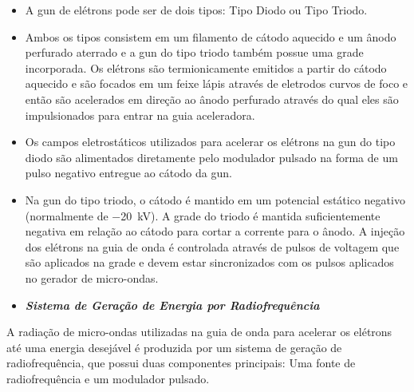 \documentclass[11pt,a4paper]{article}
\begin{document}
    \begin{itemize}
		\item A gun de elétrons pode ser de dois tipos: Tipo Diodo ou Tipo Triodo.
		
		\item Ambos os tipos consistem em um filamento de cátodo aquecido e um ânodo perfurado aterrado e a gun do tipo triodo também possue uma grade incorporada. Os elétrons são  termionicamente emitidos a partir do cátodo aquecido e são focados em um feixe lápis através de eletrodos curvos de foco e então são acelerados em direção ao ânodo perfurado  através do qual eles são impulsionados para entrar na guia aceleradora.
		
		\item Os campos eletrostáticos utilizados para acelerar os elétrons na gun do tipo diodo são alimentados diretamente pelo modulador pulsado na forma de um pulso negativo entregue ao cátodo da gun.
		
		\item Na gun do tipo triodo, o cátodo é mantido em um potencial estático negativo (normalmente de \qty{-20}{kV}). A grade do triodo é mantida suficientemente negativa em relação ao cátodo para cortar a corrente para o ânodo. A injeção dos elétrons na guia de onda é controlada através de pulsos de voltagem que são aplicados na grade e devem estar sincronizados com os pulsos aplicados no gerador de micro-ondas.
	\end{itemize}                
                    
            
                \begin{itemize}
                    \item \textbf{\textit{\textcolor{CarnationPink}{Sistema de Geração de Energia por Radiofrequência}}}
                \end{itemize}

    A radiação de micro-ondas utilizadas na guia de onda para acelerar os elétrons até uma energia desejável é produzida por um sistema de geração de radiofrequência, que possui duas componentes principais: Uma fonte de radiofrequência e um modulador pulsado. 
\end{document}

